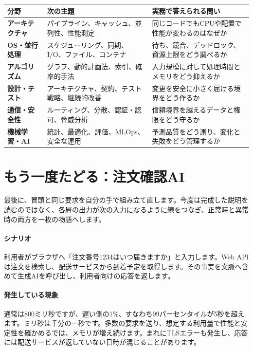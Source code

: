 \begingroup
  \noindent
  \begin{tabularx}{\textwidth}{@{}>{\bfseries}p{30mm}YY@{}}
    \toprule
    分野 & 次の主題 & 実務で答えられる問い \\
    \midrule
    アーキテクチャ & パイプライン、キャッシュ、並列性、性能測定 & 同じコードでもCPUや配置で性能が変わるのはなぜか \\
    OS・並行処理 & スケジューリング、同期、I/O、ファイル、コンテナ & 待ち、競合、デッドロック、資源上限をどう調べるか \\
    アルゴリズム & グラフ、動的計画法、索引、確率的手法 & 入力規模に対して処理時間とメモリをどう抑えるか \\
    設計・テスト & アーキテクチャ、契約、テスト戦略、継続的改善 & 変更を安全に小さく届ける境界をどう作るか \\
    通信・安全性 & ルーティング、分散、認証・認可、脅威分析 & 信頼境界を越えるデータと権限をどう守るか \\
    機械学習・AI & 統計、最適化、評価、MLOps、安全な運用 & 予測品質をどう測り、変化と失敗をどう管理するか \\
    \bottomrule
  \end{tabularx}
  \vspace{1mm}
\par
\endgroup


\section{もう一度たどる：注文確認AI}
\label{sec:07-practice-15}

最後に、冒頭と同じ要求を自分の手で組み立て直します。今度は完成した説明を読むのではなく、各層の出力が次の入力になるように線をつなぎ、正常時と異常時の両方を一枚の物語へします。

\begingroup
\begingroup
\paragraph{シナリオ}
        利用者がブラウザへ「注文番号1234はいつ届きますか」と入力します。Web APIは注文を検索し、配送サービスから到着予定を取得します。その事実を文脈へ含めて生成AIを呼び出し、利用者向けの応答を返します。

\paragraph{発生している現象}
        通常は800ミリ秒ですが、遅い側の1\%、すなわち99パーセンタイルが5秒を超えます。ミリ秒は千分の一秒です。多数の要求を送り、想定する利用量で性能と安定性を確かめるでは、メモリが増え続けます。まれにTLSエラーも発生し、応答には配送サービスが返していない日時が混じることがあります。

